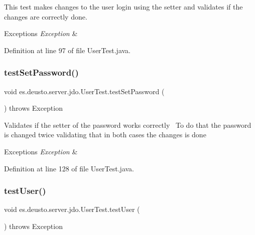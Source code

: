 This test makes changes to the user login using the setter and validates if the changes are correctly done. 
\begin{DoxyExceptions}{Exceptions}
{\em Exception} & \\
\hline
\end{DoxyExceptions}


Definition at line 97 of file User\+Test.\+java.

\mbox{\label{classes_1_1deusto_1_1server_1_1jdo_1_1_user_test_a03e1fab080aa109c4df4985c370934c8}} 
\subsubsection{\texorpdfstring{test\+Set\+Password()}{testSetPassword()}}
{\footnotesize\ttfamily void es.\+deusto.\+server.\+jdo.\+User\+Test.\+test\+Set\+Password (\begin{DoxyParamCaption}{ }\end{DoxyParamCaption}) throws Exception}

Validates if the setter of the password works correctly~\newline
To do that the password is changed twice validating that in both cases the changes is done 
\begin{DoxyExceptions}{Exceptions}
{\em Exception} & \\
\hline
\end{DoxyExceptions}


Definition at line 128 of file User\+Test.\+java.

\mbox{\label{classes_1_1deusto_1_1server_1_1jdo_1_1_user_test_a3e1ca2f6eb28866bbbf7568638f035e8}} 
\subsubsection{\texorpdfstring{test\+User()}{testUser()}}
{\footnotesize\ttfamily void es.\+deusto.\+server.\+jdo.\+User\+Test.\+test\+User (\begin{DoxyParamCaption}{ }\end{DoxyParamCaption}) throws Exception}

